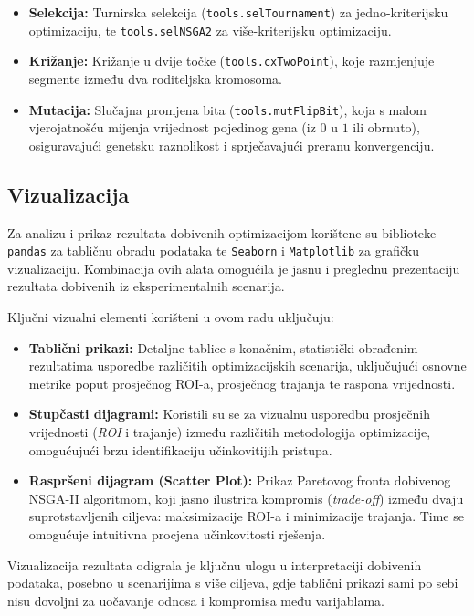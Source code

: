 \begin{itemize}
    \item \textbf{Selekcija:}  
    Turnirska selekcija (\texttt{tools.selTournament}) za jedno-kriterijsku optimizaciju,  
    te \texttt{tools.selNSGA2} za više-kriterijsku optimizaciju.
    
    \item \textbf{Križanje:}  
    Križanje u dvije točke (\texttt{tools.cxTwoPoint}), koje razmjenjuje segmente između dva roditeljska kromosoma.
    
    \item \textbf{Mutacija:}  
    Slučajna promjena bita (\texttt{tools.mutFlipBit}), koja s malom vjerojatnošću mijenja vrijednost pojedinog gena (iz $0$ u $1$ ili obrnuto), osiguravajući genetsku raznolikost i sprječavajući preranu konvergenciju.
\end{itemize}


\subsection{Vizualizacija}

Za analizu i prikaz rezultata dobivenih optimizacijom korištene su biblioteke \texttt{pandas} za tabličnu obradu podataka te \texttt{Seaborn} i \texttt{Matplotlib} \cite{Waskom2021, Hunter2007} za grafičku vizualizaciju.
Kombinacija ovih alata omogućila je jasnu i preglednu prezentaciju rezultata 
dobivenih iz eksperimentalnih scenarija.

Ključni vizualni elementi korišteni u ovom radu uključuju:

\begin{itemize}
    \item \textbf{Tablični prikazi:} Detaljne tablice s konačnim, statistički obrađenim rezultatima 
    usporedbe različitih optimizacijskih scenarija, uključujući osnovne metrike 
    poput prosječnog ROI-a, prosječnog trajanja te raspona vrijednosti.

    \item \textbf{Stupčasti dijagrami:} Koristili su se za vizualnu usporedbu prosječnih vrijednosti 
    (\textit{ROI} i trajanje) između različitih metodologija optimizacije, omogućujući brzu identifikaciju 
    učinkovitijih pristupa.

    \item \textbf{Raspršeni dijagram (Scatter Plot):} Prikaz Paretovog fronta dobivenog NSGA-II algoritmom, 
    koji jasno ilustrira kompromis (\textit{trade-off}) između dvaju suprotstavljenih ciljeva:
    maksimizacije ROI-a i minimizacije trajanja. Time se omogućuje intuitivna procjena 
    učinkovitosti rješenja.
\end{itemize}

Vizualizacija rezultata odigrala je ključnu ulogu u interpretaciji dobivenih podataka, 
posebno u scenarijima s više ciljeva, gdje tablični prikazi sami po sebi nisu dovoljni 
za uočavanje odnosa i kompromisa među varijablama.


